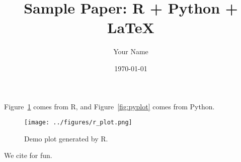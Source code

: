 \documentclass[11pt,a4paper]{article}
\title{Sample Paper: R + Python + \LaTeX{}}
\author{Your Name}
\date{\today}
\begin{document}
\maketitle

Figure~\ref{fig:rplot} comes from R, and Figure~\ref{fig:pyplot} comes from Python.

\begin{figure}[h!]
  \centering
  \texttt{[image: ../figures/r\_plot.png]}
  \caption{Demo plot generated by R.}
  \label{fig:rplot}
\end{figure}


We cite \textcite{varian2014intermediate} for fun.

\printbibliography
\end{document}
